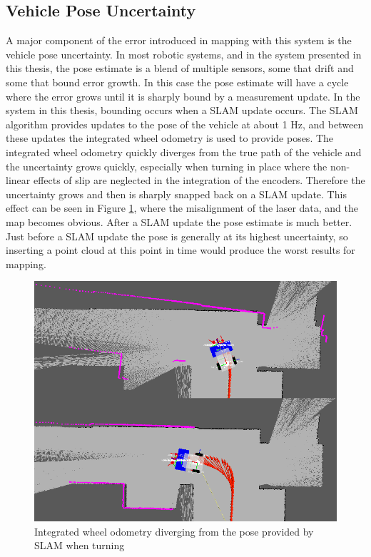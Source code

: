 \documentclass[12pt]{report}
\begin{document}
\subsection{Vehicle Pose Uncertainty}
\label{sec:uncertainty}
A major component of the error introduced in mapping with this system is the vehicle pose uncertainty.  In most robotic systems, and in the system presented in this thesis, the pose estimate is a blend of multiple sensors, some that drift and some that bound error growth.  In this case the pose estimate will have a cycle where the error grows until it is sharply bound by a measurement update.  In the system in this thesis, bounding occurs when a SLAM update occurs.  The SLAM algorithm provides updates to the pose of the vehicle at about 1 Hz, and between these updates the integrated wheel odometry is used to provide poses.  The integrated wheel odometry quickly diverges from the true path of the vehicle and the uncertainty grows quickly, especially when turning in place where the non-linear effects of slip are neglected in the integration of the encoders.  Therefore the uncertainty grows and then is sharply snapped back on a SLAM update.  This effect can be seen in Figure \ref{fig:uncertainty}, where the misalignment of the laser data, and the map becomes obvious.  After a SLAM update the pose estimate is much better.  Just before a SLAM update the pose is generally at its highest uncertainty, so inserting a point cloud at this point in time would produce the worst results for mapping.

\begin{figure}[ht]
  \centering
  \includegraphics[width=6in,keepaspectratio]{uncertainty.png}
  \caption{Integrated wheel odometry diverging from the pose provided by SLAM when turning}
  \label{fig:uncertainty}
\end{figure}
\end{document}
